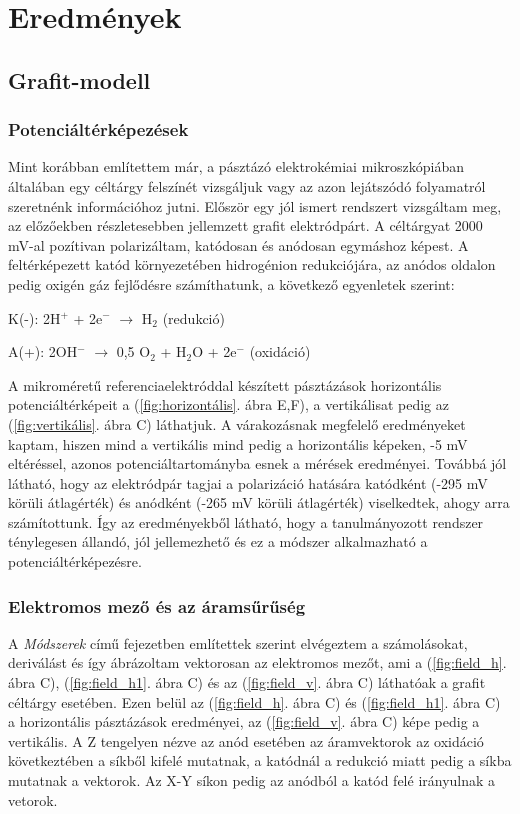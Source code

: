\chapter{Eredmények}
\pagestyle{headings}

\section{Grafit-modell}
\subsection{Potenciáltérképezések}
Mint korábban említettem már, a pásztázó elektrokémiai mikroszkópiában általában egy céltárgy felszínét vizsgáljuk vagy az azon lejátszódó folyamatról szeretnénk információhoz jutni. Először egy jól ismert rendszert vizsgáltam meg, az előzőekben részletesebben jellemzett grafit elektródpárt. A céltárgyat 2000 mV-al pozítivan polarizáltam, katódosan és anódosan egymáshoz képest. A feltérképezett katód környezetében hidrogénion redukciójára, az anódos oldalon pedig oxigén gáz fejlődésre számíthatunk, a következő egyenletek szerint:

K(-): 2H$^+$ + 2e$^-$ $\longrightarrow$ H$_2$ (redukció)

A(+):  2OH$^-$ $\longrightarrow$ 0,5 O$_2$ + H$_2$O + 2e$^-$ (oxidáció)

A mikroméretű referenciaelektróddal készített pásztázások horizontális potenciáltérképeit a (\ref{fig:horizontális}. ábra E,F), a vertikálisat pedig az (\ref{fig:vertikális}. ábra C) láthatjuk. A várakozásnak megfelelő eredményeket kaptam, hiszen mind a vertikális mind pedig a horizontális képeken, -5 mV eltéréssel, azonos potenciáltartományba esnek a mérések eredményei. Továbbá jól látható, hogy az elektródpár tagjai a polarizáció hatására katódként (-295 mV körüli átlagérték) és anódként (-265 mV körüli átlagérték) viselkedtek, ahogy arra számítottunk. Így az eredményekből látható, hogy a tanulmányozott rendszer ténylegesen állandó, jól jellemezhető és ez a módszer alkalmazható a potenciáltérképezésre. 

\subsection{Elektromos mező és az áramsűrűség}
A \emph{Módszerek} című fejezetben említettek szerint elvégeztem a számolásokat, deriválást és így ábrázoltam vektorosan az elektromos mezőt, ami a (\ref{fig:field_h}. ábra C), (\ref{fig:field_h1}. ábra C) és az (\ref{fig:field_v}. ábra C) láthatóak a grafit céltárgy esetében. Ezen belül az (\ref{fig:field_h}. ábra C) és (\ref{fig:field_h1}. ábra C) a horizontális pásztázások eredményei, az (\ref{fig:field_v}. ábra C) képe pedig a vertikális. A Z tengelyen nézve az anód esetében az áramvektorok az oxidáció következtében a síkből kifelé mutatnak, a katódnál a redukció miatt pedig a síkba mutatnak a vektorok. Az X-Y síkon pedig az anódból a katód felé irányulnak a vetorok.  

